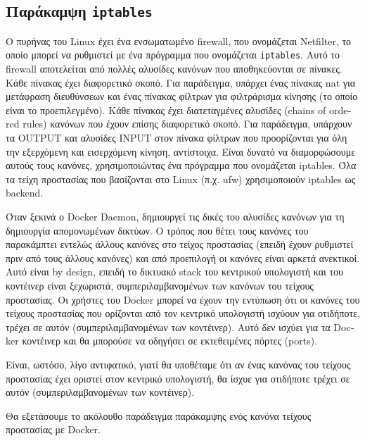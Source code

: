 \subsection{Παράκαμψη \texttt{\textlatin{iptables}}}

Ο πυρήνας του \textlatin{Linux} έχει ένα ενσωματωμένο \textlatin{firewall}, που
ονομάζεται \textlatin{Netfilter}, το οποίο μπορεί να ρυθμιστεί με ένα πρόγραμμα
που ονομάζεται \texttt{\textlatin{iptables}}. Αυτό το \textlatin{firewall}
αποτελείται από πολλές αλυσίδες κανόνων που αποθηκεύονται σε πίνακες. Κάθε
πίνακας έχει διαφορετικό σκοπό.
Για παράδειγμα, υπάρχει ένας πίνακας \textlatin{nat} για μετάφραση διευθύνσεων
και ένας πίνακας φίλτρων για φιλτράρισμα κίνησης (το οποίο είναι το
προεπιλεγμένο). Κάθε πίνακας έχει διατεταγμένες αλυσίδες (\textlatin{chains of
ordered rules})
κανόνων που έχουν επίσης διαφορετικό σκοπό. Για παράδειγμα, υπάρχουν τα
\textlatin{OUTPUT} και αλυσίδες \textlatin{INPUT} στον πίνακα φίλτρων που
προορίζονται για όλη την εξερχόμενη και
εισερχόμενη κίνηση, αντίστοιχα. Είναι δυνατό να διαμορφώσουμε αυτούς τους
κανόνες, χρησιμοποιώντας ένα πρόγραμμα που ονομάζεται \textlatin{iptables}. Όλα
τα τείχη προστασίας που βασίζονται στο \textlatin{Linux} (π.χ. \textlatin{ufw})
χρησιμοποιούν \textlatin{iptables} ως \textlatin{backend}.

Όταν ξεκινά ο \textlatin{Docker Daemon}, δημιουργεί τις δικές του αλυσίδες
κανόνων για τη δημιουργία απομονωμένων δικτύων. Ο τρόπος που θέτει τους κανόνες
του παρακάμπτει εντελώς άλλους κανόνες στο τείχος προστασίας (επειδή έχουν
ρυθμιστεί πριν από τους άλλους κανόνες) και από προεπιλογή οι κανόνες είναι
αρκετά ανεκτικοί. Αυτό είναι \textlatin{by design}, επειδή το δικτυακό
\textlatin{stack} του κεντρικού υπολογιστή και του κοντέινερ είναι ξεχωριστά,
συμπεριλαμβανομένων των κανόνων του τείχους προστασίας. Οι χρήστες του
\textlatin{Docker} μπορεί να έχουν την εντύπωση ότι οι κανόνες του τείχους
προστασίας που ορίζονται από τον κεντρικό υπολογιστή ισχύουν για οτιδήποτε,
τρέχει σε αυτόν (συμπεριλαμβανομένων των κοντέινερ). Αυτό δεν ισχύει για τα
\textlatin{Docker} κοντέινερ και θα μπορούσε να οδηγήσει σε εκτεθειμένες πόρτες
(\textlatin{ports}).

Είναι, ωστόσο, λίγο αντιφατικό, γιατί θα υποθέταμε ότι αν ένας κανόνας του
τείχους προστασίας έχει οριστεί στον κεντρικό υπολογιστή, θα ίσχυε για οτιδήποτε
τρέχει σε αυτόν (συμπεριλαμβανομένων των κοντέινερ).

Θα εξετάσουμε το ακόλουθο παράδειγμα παράκαμψης ενός κανόνα τείχους προστασίας
με \textlatin{Docker}. \\


